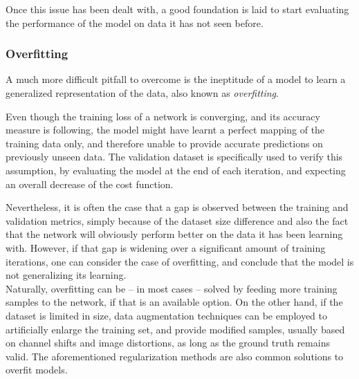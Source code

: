 Once this issue has been dealt with, a good foundation is laid to start
evaluating the performance of the model on data it has not seen before.

	\subsubsection{Overfitting}

A much more difficult pitfall to overcome is the ineptitude of a model to learn
a generalized representation of the data, also known as \emph{overfitting}.

Even though the training loss of a network is converging, and its accuracy
measure is following, the model might have learnt a perfect mapping of the
training data only, and therefore unable to provide accurate predictions on
previously unseen data. The validation dataset is specifically used to verify
this assumption, by evaluating the model at the end of each iteration, and
expecting an overall decrease of the cost function.

Nevertheless, it is often the case that a gap is observed between the training
and validation metrics, simply because of the dataset size difference and also
the fact that the network will obviously perform better on the data it has been
learning with. However, if that gap is widening over a significant amount of
training iterations, one can consider the case of overfitting, and conclude
that the model is not generalizing its learning.\\

Naturally, overfitting can be -- in most cases -- solved by feeding more
training samples to the network, if that is an available option. On the other
hand, if the dataset is limited in size, data augmentation techniques can be
employed to artificially enlarge the training set, and provide modified
samples, usually based on channel shifts and image distortions, as long as the
ground truth remains valid. The aforementioned regularization methods are also
common solutions to overfit models.
